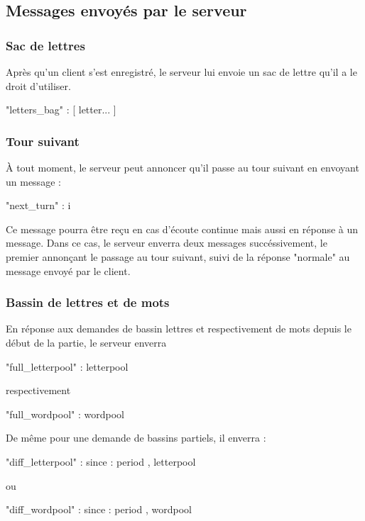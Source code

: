 \documentclass{article}
\begin{document}
\subsection{Messages envoyés par le serveur}
\label{sec:messages-envoyes}

\subsubsection{Sac de lettres}
\label{sec:sac-de-lettres}
Après qu'un client s'est enregistré, le serveur lui envoie un sac de
lettre qu'il a le droit d'utiliser.
\begin{jsonMessage}
  { "letters_bag" : [ letter... ] }
\end{jsonMessage}

\subsubsection{Tour suivant}
\label{sec:tour-suivant}
À tout moment, le serveur peut annoncer qu'il passe au tour suivant en
envoyant un message :
\begin{jsonMessage}
  { "next_turn" : i }
\end{jsonMessage}
Ce message pourra être reçu en cas d'écoute continue mais aussi en
réponse à un message. Dans ce cas, le serveur enverra deux messages
succéssivement, le premier annonçant le passage au tour suivant, suivi
de la réponse "normale" au message envoyé par le client.


\subsubsection{Bassin de lettres et de mots}
\label{sec:bassin-de-lettres}
En réponse aux demandes de bassin lettres et respectivement de mots
depuis le début de la partie, le serveur enverra
\begin{jsonMessage}
  { "full_letterpool" : letterpool }
\end{jsonMessage}
respectivement
\begin{jsonMessage}
  { "full_wordpool" : wordpool }
\end{jsonMessage}
De même pour une demande de bassins partiels, il enverra :

 \begin{jsonMessage}
   { "diff_letterpool" : {since : period , letterpool } }
 \end{jsonMessage}
 ou
 \begin{jsonMessage}
   { "diff_wordpool" : {since : period , wordpool } }
 \end{jsonMessage}
\end{document}
